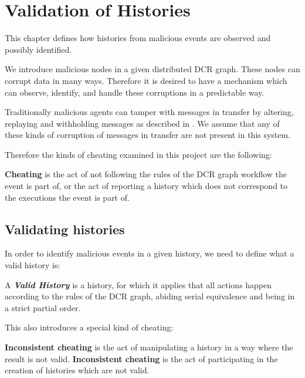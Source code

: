 \chapter{Validation of Histories}
\label{chap:consensusindcr}
	This chapter defines how histories from malicious events are observed and possibly identified.
	
	\newpar We introduce malicious nodes in a given distributed DCR graph. These nodes can corrupt data in many ways. Therefore it is desired to have a mechanism which can observe, identify, and handle these corruptions in a predictable way. 
	
	Traditionally malicious agents can tamper with messages in transfer by altering, replaying and withholding messages as described in \cite{Coulouris:2011:DSC:2029110:chapter2}. We assume that any of these kinds of corruption of messages in transfer are not present in this system. 
	
	\newpar Therefore the kinds of cheating examined in this project are the following:
	\begin{definition}
		\textbf{Cheating} is the act of not following the rules of the DCR graph workflow the event is part of, or the act of reporting a history which does not correspond to the executions the event is part of.
	\end{definition}
	
	\section{Validating histories}
	In order to identify malicious events in a given history, we need to define what a valid history is:
	
		\begin{definition}
			A \textit{\textbf{Valid History}} is a history, for which it applies that all actions happen according to the rules of the DCR graph, abiding serial equivalence and being in a strict partial order. 
		\end{definition}
		
	This also introduces a special kind of cheating:
	
		\begin{definition}
			\textbf{Inconsistent cheating} is the act of manipulating a history in a way where the result is not valid.
			\textbf{Inconsistent cheating} is the act of participating in the creation of histories which are not valid.
		\end{definition}
		
